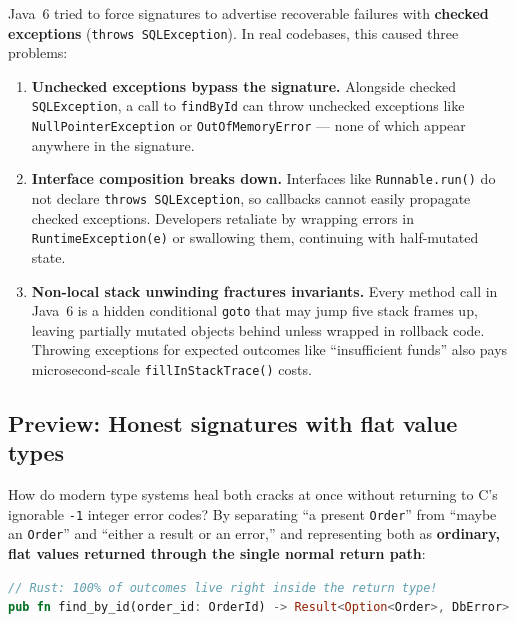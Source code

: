 Java~6 tried to force signatures to advertise recoverable failures with \textbf{checked exceptions} (\texttt{throws SQLException}). In real codebases, this caused three problems:
\begin{enumerate}
  \item \textbf{Unchecked exceptions bypass the signature.} Alongside checked \texttt{SQLException}, a call to \texttt{findById} can throw unchecked exceptions like \texttt{NullPointerException} or \texttt{OutOfMemoryError} --- none of which appear anywhere in the signature.
  \item \textbf{Interface composition breaks down.} Interfaces like \texttt{Runnable.run()} do not declare \texttt{throws SQLException}, so callbacks cannot easily propagate checked exceptions. Developers retaliate by wrapping errors in \texttt{RuntimeException(e)} or swallowing them, continuing with half-mutated state.
  \item \textbf{Non-local stack unwinding fractures invariants.} Every method call in Java~6 is a hidden conditional \texttt{goto} that may jump five stack frames up, leaving partially mutated objects behind unless wrapped in rollback code. Throwing exceptions for expected outcomes like ``insufficient funds'' also pays microsecond-scale \texttt{fillInStackTrace()} costs.
\end{enumerate}

\subsection{Preview: Honest signatures with flat value types}

How do modern type systems heal both cracks at once without returning to C's ignorable \texttt{-1} integer error codes? By separating ``a present \texttt{Order}'' from ``maybe an \texttt{Order}'' and ``either a result or an error,'' and representing both as \textbf{ordinary, flat values returned through the single normal return path}:

\begin{lstlisting}[language=Rust]
// Rust: 100% of outcomes live right inside the return type!
pub fn find_by_id(order_id: OrderId) -> Result<Option<Order>, DbError>
\end{lstlisting}

